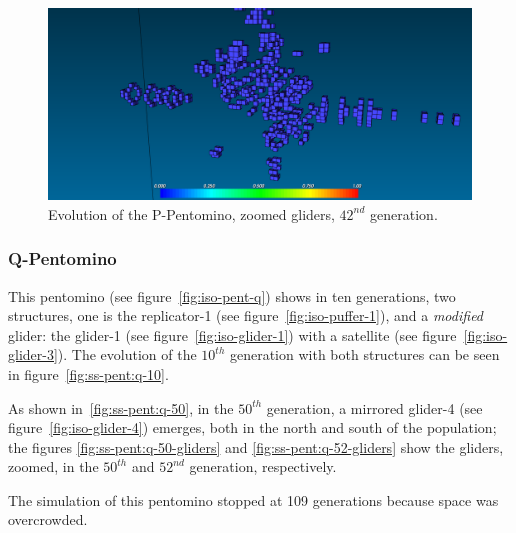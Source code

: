 \begin{figure}
	\centering
	\includegraphics[scale=0.3]{pentominoes_ss/p_42_gliders.png}
	\caption{Evolution of the P-Pentomino, zoomed gliders, $42^{nd}$ generation.}
  \label{fig:ss-pent:p-42-glider}
\end{figure}


\subsubsection{Q-Pentomino}
\label{sec:q-pentomino}
This pentomino (see figure~\ref{fig:iso-pent-q}) shows in ten generations, two
structures, one is the replicator-1 (see figure~\ref{fig:iso-puffer-1}), and a
\textit{modified} glider: the glider-1 (see figure~\ref{fig:iso-glider-1}) with
a satellite (see figure~\ref{fig:iso-glider-3}). The evolution of the $10^{th}$
generation with both structures can be seen in figure~\ref{fig:ss-pent:q-10}.

As shown in~\ref{fig:ss-pent:q-50}, in the $50^{th}$ generation, a mirrored
glider-4 (see figure~\ref{fig:iso-glider-4}) emerges, both in the north and
south of the population; the figures \ref{fig:ss-pent:q-50-gliders} and
\ref{fig:ss-pent:q-52-gliders} show the gliders, zoomed, in the $50^{th}$ and
$52^{nd}$ generation, respectively.

The simulation of this pentomino stopped at 109 generations because space
was overcrowded.

